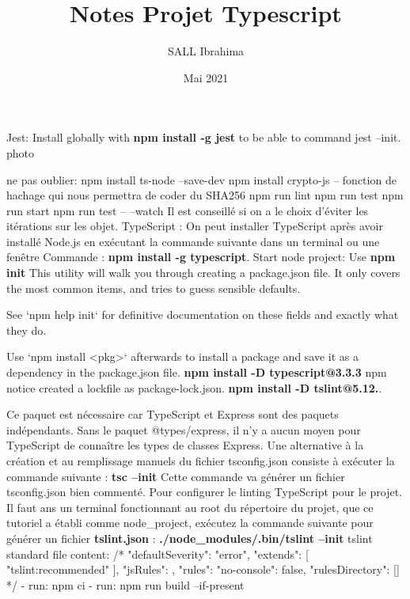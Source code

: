 \documentclass[table]{article}
\title{Notes Projet Typescript}
\author{SALL Ibrahima}
\date{Mai 2021}
\begin{document}



Jest: Install globally with \textbf{npm install -g jest} to be able to command jest --init.
photo

ne pas oublier:     npm install ts-node --save-dev
npm install crypto-js -- fonction de hachage qui nous permettra de coder du SHA256
npm run lint
npm run test 
npm run start
npm run test -- --watch
\newline Il est conseillé si on a le choix d'éviter les itérations sur les objet.
\newline TypeScript : On peut installer TypeScript après avoir installé Node.js en exécutant la commande suivante dans un terminal ou une fenêtre Commande : \textbf{npm install -g typescript}.
\newline Start node project: Use \textbf{npm init} 
This utility will walk you through creating a package.json file.
It only covers the most common items, and tries to guess sensible defaults.

See `npm help init` for definitive documentation on these fields
and exactly what they do.

Use `npm install <pkg>` afterwards to install a package and
save it as a dependency in the package.json file. 
\newline \textbf{npm install -D typescript@3.3.3} npm notice created a lockfile as package-lock.json.
\newline \textbf{npm install -D tslint@5.12.}.

\newline Ce paquet est nécessaire car TypeScript et Express sont des paquets indépendants. Sans le paquet @types/express, il n'y a aucun moyen pour TypeScript de connaître les types de classes Express.
\newline Une alternative à la création et au remplissage manuels du fichier tsconfig.json consiste à exécuter la commande suivante :
\textbf{tsc --init} Cette commande va générer un fichier tsconfig.json bien commenté.
\newline Pour configurer le linting TypeScript pour le projet. Il faut ans un terminal fonctionnant au root du répertoire du projet, que ce tutoriel a établi comme node_project, exécutez la commande suivante pour générer un fichier \textbf{tslint.json} :
\textbf{./node_modules/.bin/tslint --init}
\newline tslint standard file content: /*{
    "defaultSeverity": "error",
    "extends": [
        "tslint:recommended"
    ],
    "jsRules": {},
    "rules": {"no-console": false},
    "rulesDirectory": []
}*/
\newline - run: npm ci
- run: npm run build --if-present
\end{document}
